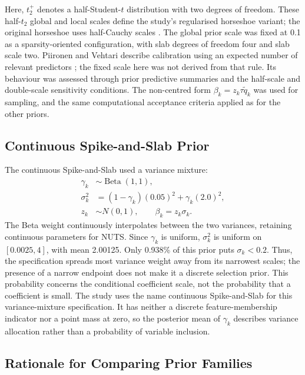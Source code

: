 Here, $t^+_2$ denotes a half-Student-$t$ distribution with two degrees of freedom. These half-$t_2$ global and local scales define the study's regularised horseshoe variant; the original horseshoe uses half-Cauchy scales \cite{carvalho2010,piironen2017}. The global prior scale was fixed at 0.1 as a sparsity-oriented configuration, with slab degrees of freedom four and slab scale two. Piironen and Vehtari describe calibration using an expected number of relevant predictors \cite{piironen2017}; the fixed scale here was not derived from that rule. Its behaviour was assessed through prior predictive summaries and the half-scale and double-scale sensitivity conditions. The non-centred form $\beta_k=z_k\tau\widetilde q_k$ was used for sampling, and the same computational acceptance criteria applied as for the other priors.

\subsection{Continuous Spike-and-Slab Prior}\label{spike-and-slab-prior}

The continuous Spike-and-Slab used a variance mixture:
\begin{align}
\gamma_k&\sim\operatorname{Beta}(1,1),\\
\sigma_k^2&=(1-\gamma_k)(0.05)^2+\gamma_k(2.0)^2,\\
z_k&\sim N(0,1),\qquad \beta_k=z_k\sigma_k.
\end{align}
The Beta weight continuously interpolates between the two variances, retaining continuous parameters for NUTS. Since $\gamma_k$ is uniform, $\sigma_k^2$ is uniform on $[0.0025,4]$, with mean 2.00125. Only 0.938\% of this prior puts $\sigma_k<0.2$. Thus, the specification spreads most variance weight away from its narrowest scales; the presence of a narrow endpoint does not make it a discrete selection prior. This probability concerns the conditional coefficient scale, not the probability that a coefficient is small. The study uses the name continuous Spike-and-Slab for this variance-mixture specification. It has neither a discrete feature-membership indicator nor a point mass at zero, so the posterior mean of $\gamma_k$ describes variance allocation rather than a probability of variable inclusion.

\subsection{Rationale for Comparing Prior Families}\label{rationale-for-comparing-prior-families.}

